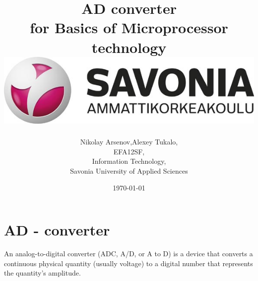 \documentclass[english]{article}
\date{}
\begin{document}
\title{\vspace{2in}AD converter\\
\small for Basics of Microprocessor technology\\
\vspace{0.5in}\includegraphics{savonia.jpg}}

\nopagebreak
\maketitle


\vspace{3in}

\author{
\begin{flushright}
Nikolay Arsenov,Alexey Tukalo,\\
EFA12SF,\\
Information Technology,\\
Savonia University of Applied Sciences
\end{flushright}
}

\date{\today}
\thispagestyle{empty}

\newpage
\setcounter{page}{1}
\setcounter{tocdepth}{2}
\tableofcontents

\newpage


\section{AD - converter}
An analog-to-digital converter (ADC, A/D, or A to D) is a device that converts a continuous physical quantity (usually voltage) to a digital number that represents the quantity's amplitude.
\end{document}
